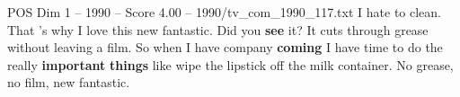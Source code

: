 \begin{textsample}{POS Dim 1 – 1990 – Score 4.00 – 1990/tv\_com\_1990\_117.txt}  \label{ex:f1_pos_058}
I hate to clean.
That 's why I love this new fantastic.
Did you \textbf{see} it?
It cuts through grease without leaving a film.
So when I have company \textbf{coming} I have time to do the really \textbf{important} \textbf{things} like wipe the lipstick off the milk container.
No grease, no film, new fantastic.

\end{textsample}
